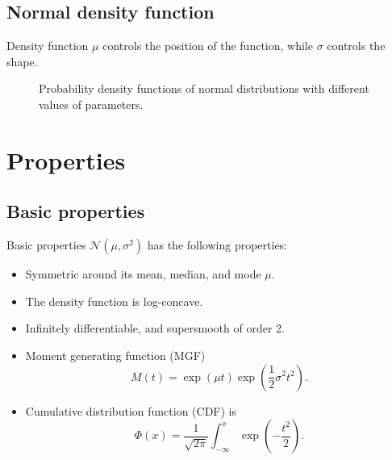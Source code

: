\documentclass{beamer}
\begin{document}
\subsection{Normal density function}

\begin{frame}{Density function}
  \(\mu\) controls the position of the function, while \(\sigma\) controls the
  shape.
  \begin{figure}[ht]
    \centering
    \caption{Probability density functions of normal distributions with
      different values of parameters.}
  \end{figure}
\end{frame}

\section{Properties}

\subsection{Basic properties}

\begin{frame}{Basic properties}
  \(\mathcal{N}(\mu, \sigma^{2})\) has the following properties:
  \begin{itemize}
  \item<1-> Symmetric around its mean, median, and mode \(\mu\).
  \item<2-> The density function is log-concave.
  \item<3-> Infinitely differentiable, and supersmooth of order 2.
  \item<4-> Moment generating function (MGF)
    \begin{equation}
      M(t) = \exp(\mu t)\exp\left( \frac{1}{2}\sigma^{2}t^{2} \right).
    \end{equation}
  \item<5-> Cumulative distribution function (CDF) is
    \begin{equation}
      \Phi(x) = \frac{1}{\sqrt{2\pi}}
      \int_{-\infty}^{x}\exp\left(-\frac{t^{2}}{2}\right).
    \end{equation}
  \end{itemize}
\end{frame}
\end{document}
